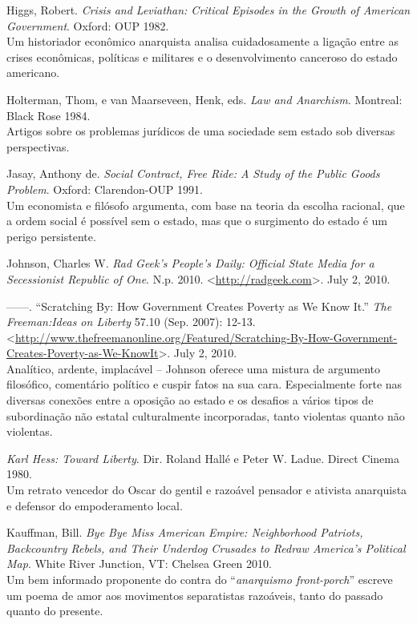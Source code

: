 \begin{hangparas}{0.25in}{1}
Higgs, Robert. \emph{Crisis and Leviathan: Critical Episodes in the Growth of American Government}. Oxford: OUP 1982.\smallskip\\
Um historiador econômico anarquista analisa cuidadosamente a ligação entre as crises econômicas, políticas e militares e o desenvolvimento canceroso do estado americano.

Holterman, Thom, e van Maarseveen, Henk, eds. \emph{Law and Anarchism}. Montreal: Black Rose 1984.\smallskip\\
Artigos sobre os problemas jurídicos de uma sociedade sem estado sob diversas perspectivas.

Jasay, Anthony de. \emph{Social Contract, Free Ride: A Study of the Public Goods Problem}. Oxford: Clarendon-OUP 1991.\smallskip\\
Um economista e filósofo argumenta, com base na teoria da escolha racional, que a ordem social é possível sem o estado, mas que o surgimento do estado é um perigo persistente.

Johnson, Charles W. \emph{Rad Geek's People's Daily: Official State Media for a Secessionist Republic of One}. N.p. 2010. <\url{http://radgeek.com}>. July 2, 2010.

------. ``Scratching By: How Government Creates Poverty as We Know It.'' \emph{The Freeman:Ideas on Liberty} 57.10 (Sep. 2007): 12-13.<\url{http://www.thefreemanonline.org/Featured/Scratching-By-How-Government-Creates-Poverty-as-We-KnowIt}>. July 2, 2010.\smallskip\\
Analítico, ardente, implacável -- Johnson oferece uma mistura de argumento filosófico, comentário político e cuspir fatos na sua cara. Especialmente forte nas diversas conexões entre a oposição ao estado e os desafios a vários tipos de subordinação não estatal culturalmente incorporadas, tanto violentas quanto não violentas.

\emph{Karl Hess: Toward Liberty}. Dir. Roland Hallé e Peter W. Ladue. Direct Cinema 1980.\smallskip\\
Um retrato vencedor do Oscar do gentil e razoável pensador e ativista anarquista e defensor do empoderamento local.

Kauffman, Bill. \emph{Bye Bye Miss American Empire: Neighborhood Patriots, Backcountry Rebels, and Their Underdog Crusades to Redraw America's Political Map}. White River Junction, VT: Chelsea Green 2010.\smallskip\\
Um bem informado proponente do contra do ``\emph{anarquismo front-porch}'' escreve um poema de amor aos movimentos separatistas razoáveis, tanto do passado quanto do presente.


\end{hangparas}
